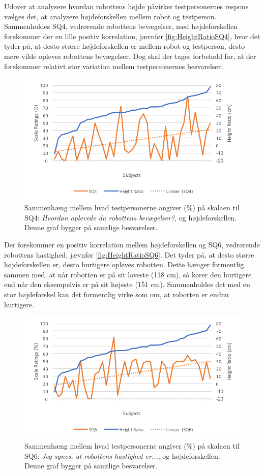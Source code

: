 \noindent
%
Udover at analysere hvordan robottens højde påvirker testpersonernes respons vælges det, at analysere højdeforskellen mellem robot og testperson. Sammenholdes SQ4, vedrørende robottens bevægelser, med højdeforskellen forekommer der en lille positiv korrelation, jævnfør \autoref{fig:HeightRatioSQ4}, hvor det tyder på, at desto større højdeforskellen er mellem robot og testperson, desto mere vilde opleves robottens bevægelser. Dog skal der tages forbehold for, at der forekommer relativt stor variation mellem testpersonernes besvarelser. 
%
\begin{figure}[H]
\centering
\includegraphics[width=\textwidth]{Figure/DatabehandlingSkalaer/Demografi/HeightRatioSQ4}
\caption{Sammenhæng mellem hvad testpersonerne angiver (\%) på skalaen til SQ4: \textit{Hvordan oplevede du robottens bevægelser?}, og højdeforskellen. Denne graf bygger på samtlige besvarelser.}
\label{fig:HeightRatioSQ4}
\end{figure}
\noindent
%
Der forekommer en positiv korrelation mellem højdeforskellen og SQ6, vedrørende robottens hastighed, jævnfør \autoref{fig:HeightRatioSQ6}. Det tyder på, at desto større højdeforskellen er, desto hurtigere opleves robotten. Dette hænger formentlig sammen med, at når robotten er på sit laveste (118 cm), så kører den hurtigere end når den eksempelvis er på sit højeste (151 cm). Sammenholdes det med en stor højdeforskel kan det formentlig virke som om, at robotten er endnu hurtigere. 
%
\begin{figure}[H]
\centering
\includegraphics[width=\textwidth]{Figure/DatabehandlingSkalaer/Demografi/HeightRatioSQ6}
\caption{Sammenhæng mellem hvad testpersonerne angiver (\%) på skalaen til SQ6: \textit{Jeg synes, at robottens hastighed er...}, og højdeforskellen. Denne graf bygger på samtlige besvarelser.}
\label{fig:HeightRatioSQ6}
\end{figure}
